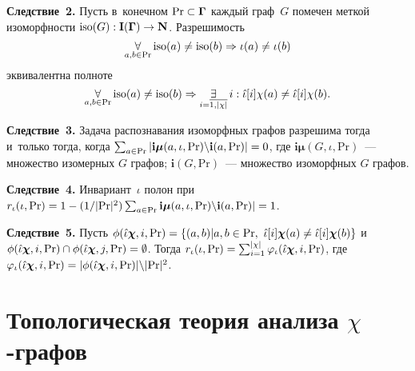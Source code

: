 \begin{multicols}{2}
\smallskip

\noindent
\textbf{Следствие~2.} Пусть в~конечном $\mathrm{Pr}\hm\subset 
\boldsymbol{\Gamma}$ каждый граф~$G$ помечен меткой изоморфности $\mathrm{iso} 
(G): \mathbf{I}(\boldsymbol{\Gamma})\hm\to \mathbf{N}$. Разрешимость 
$$
\underset{a,b\in \mathrm{Pr}}{\forall}\, \mathrm{iso}(a)\not= \mathrm{iso}(b)\hm\Rightarrow 
\iota(a)\hm\not= \iota(b)
$$
эквивалентна полноте 
$$
\underset{a,b\in \mathrm{Pr}}{\forall}\,\mathrm{iso}(a)\not= 
\mathrm{iso}(b)\hm\Rightarrow
\underset{i=\overline{1,\vert\chi\vert}}{\exists}\, i: \hat{\iota}[i] \chi(a) \not= \hat{\iota} [i] 
\chi(b).
$$



\noindent
\textbf{Следствие~3.} Задача распознавания изоморфных графов разрешима 
тогда и~только тогда, когда $\sum\nolimits_{a\in\mathrm{Pr}} \vert 
\mathbf{i}\boldsymbol{\mu}(a,\iota,\mathrm{Pr})\backslash 
\mathbf{i}(a,\mathrm{Pr})\vert \hm=0$, где $\mathbf{i}\boldsymbol{\mu}(G,\iota, 
\mathrm{Pr})$~--- множество изомерных $G$ графов; $\mathbf{i}(G, 
\mathrm{Pr})$~--- множество изоморфных $G$ графов. 

\smallskip


\noindent
\textbf{Следствие~4.} Инвариант~$\iota$ полон при $r_\iota (\iota, 
\mathrm{Pr})=1-(1/\vert \mathrm{Pr}\vert^2)\sum\nolimits_{a\in\mathrm{Pr}} 
\mathbf{i}\boldsymbol{\mu}(a,\iota,\mathrm{Pr})\backslash 
\mathbf{i}(a,\mathrm{Pr})\vert \hm=1$. 

\smallskip

\noindent
\textbf{Следствие~5.} Пусть 
$\phi(\hat{\iota}\boldsymbol{\chi},i,\mathrm{Pr})\hm= \{(a,b)\vert a,b\hm\in 
\mathrm{Pr},\ \hat{\iota}[i]\boldsymbol{\chi}(a)\not= 
\hat{\iota}[i]\boldsymbol{\chi}(b)\}$ 
и~$\phi(\hat{\iota}\boldsymbol{\chi},i,\mathrm{Pr})\cap\phi(\hat{\iota}\boldsymbol{\chi},j,\mathrm{Pr})
\hm=\emptyset$. Тогда $r_\iota(\iota, \mathrm{Pr})\hm= 
\sum\nolimits_{i=1}^{\vert\chi\vert} \varphi_\iota 
(\hat{\iota}\boldsymbol{\chi},i,\mathrm{Pr})$,  где
$\varphi_\iota(\hat{\iota}\boldsymbol{\chi},i,\mathrm{Pr})\hm= \vert 
\phi(\hat{\iota}\boldsymbol{\chi}, i,\mathrm{Pr}) \vert\backslash 
\vert\mathrm{Pr}\vert^2$. 

\vspace*{-6pt}

\section{Топологическая теория анализа $\chi$-графов}


\end{multicols}
